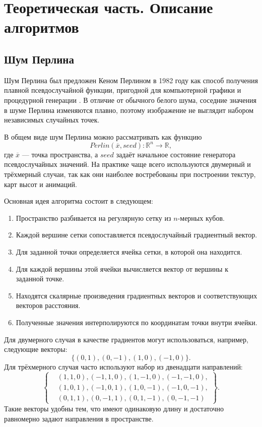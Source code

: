 \chapter{Теоретическая часть. Описание алгоритмов}

\section{Шум Перлина}

Шум Перлина был предложен Кеном Перлином в 1982 году как способ получения плавной псевдослучайной функции, пригодной для компьютерной графики и процедурной генерации \cite{perlin_eevee,perlin_habr,perlin_rtouti}. В отличие от обычного белого шума, соседние значения в шуме Перлина изменяются плавно, поэтому изображение не выглядит набором независимых случайных точек.

В общем виде шум Перлина можно рассматривать как функцию
\[
    Perlin(\overline{x}, seed): \mathbb{R}^n \rightarrow \mathbb{R},
\]
где $\overline{x}$ --- точка пространства, а $seed$ задаёт начальное состояние генератора псевдослучайных значений. На практике чаще всего используются двумерный и трёхмерный случаи, так как они наиболее востребованы при построении текстур, карт высот и анимаций.

Основная идея алгоритма состоит в следующем:
\begin{enumerate}
    \item Пространство разбивается на регулярную сетку из $n$-мерных кубов.
    \item Каждой вершине сетки сопоставляется псевдослучайный градиентный вектор.
    \item Для заданной точки определяется ячейка сетки, в которой она находится.
    \item Для каждой вершины этой ячейки вычисляется вектор от вершины к заданной точке.
    \item Находятся скалярные произведения градиентных векторов и соответствующих векторов расстояния.
    \item Полученные значения интерполируются по координатам точки внутри ячейки.
\end{enumerate}

Для двумерного случая в качестве градиентов могут использоваться, например, следующие векторы:
\[
\{(0,1),(0,-1),(1,0),(-1,0)\}.
\]
Для трёхмерного случая часто используют набор из двенадцати направлений:
\[
\left\{
\begin{aligned}
&(1,1,0),(-1,1,0),(1,-1,0),(-1,-1,0),\\
&(1,0,1),(-1,0,1),(1,0,-1),(-1,0,-1),\\
&(0,1,1),(0,-1,1),(0,1,-1),(0,-1,-1)
\end{aligned}
\right\}.
\]
Такие векторы удобны тем, что имеют одинаковую длину и достаточно равномерно задают направления в пространстве.

